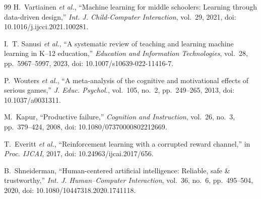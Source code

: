 \documentclass[conference]{IEEEtran}
\begin{document}
\begin{thebibliography}{99}
H.~Vartiainen \emph{et al.},
``Machine learning for middle schoolers: Learning through data-driven design,''
\emph{Int. J. Child-Computer Interaction}, vol.~29, 2021, doi: 10.1016/j.ijcci.2021.100281.

I.~T. Sanusi \emph{et al.},
``A systematic review of teaching and learning machine learning in K--12 education,''
\emph{Education and Information Technologies}, vol.~28, pp.~5967--5997, 2023, doi: 10.1007/s10639-022-11416-7.

P.~Wouters \emph{et al.},
``A meta-analysis of the cognitive and motivational effects of serious games,''
\emph{J. Educ. Psychol.}, vol.~105, no.~2, pp.~249--265, 2013, doi: 10.1037/a0031311.

M.~Kapur,
``Productive failure,''
\emph{Cognition and Instruction}, vol.~26, no.~3, pp.~379--424, 2008, doi: 10.1080/07370000802212669.

T.~Everitt \emph{et al.},
``Reinforcement learning with a corrupted reward channel,''
in \emph{Proc. IJCAI}, 2017, doi: 10.24963/ijcai.2017/656.

B.~Shneiderman,
``Human-centered artificial intelligence: Reliable, safe \& trustworthy,''
\emph{Int. J. Human--Computer Interaction}, vol.~36, no.~6, pp.~495--504, 2020, doi: 10.1080/10447318.2020.1741118.

\end{thebibliography}
\end{document}
